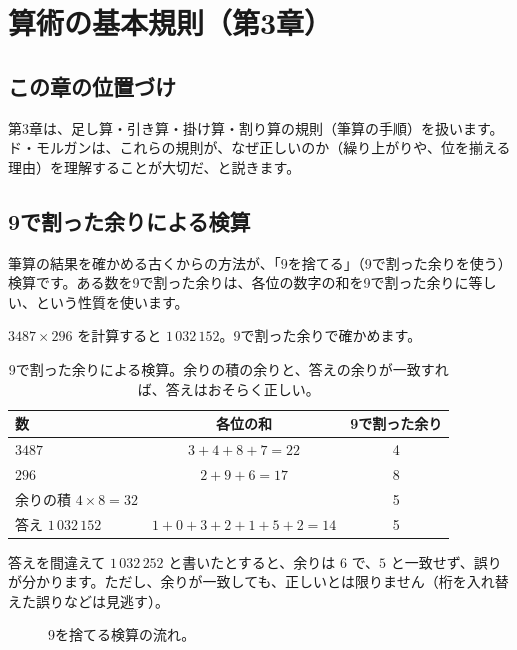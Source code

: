 \documentclass[a4paper,11pt,openany]{ltjsbook}
\begin{document}
\chapter{算術の基本規則（第3章）}

\section{この章の位置づけ}

第3章は、足し算・引き算・掛け算・割り算の規則（筆算の手順）を扱います。ド・モルガンは、これらの規則が、なぜ正しいのか（繰り上がりや、位を揃える理由）を理解することが大切だ、と説きます。

\section{9で割った余りによる検算}

筆算の結果を確かめる古くからの方法が、「9を捨てる」（9で割った余りを使う）検算です。ある数を9で割った余りは、各位の数字の和を9で割った余りに等しい、という性質を使います。

$3487\times296$ を計算すると $1\,032\,152$。9で割った余りで確かめます。

\begin{table}[htbp]
\centering
\begin{tabular}{lcc}
\toprule
数 & 各位の和 & 9で割った余り\\
\midrule
$3487$ & $3+4+8+7=22$ & 4\\
$296$ & $2+9+6=17$ & 8\\
余りの積 $4\times8=32$ & & 5\\
答え $1\,032\,152$ & $1+0+3+2+1+5+2=14$ & 5\\
\bottomrule
\end{tabular}
\caption{9で割った余りによる検算。余りの積の余りと、答えの余りが一致すれば、答えはおそらく正しい。}
\end{table}

答えを間違えて $1\,032\,252$ と書いたとすると、余りは $6$ で、$5$ と一致せず、誤りが分かります。ただし、余りが一致しても、正しいとは限りません（桁を入れ替えた誤りなどは見逃す）。

\begin{figure}[htbp]
\centering
{}
\caption{9を捨てる検算の流れ。}
\end{figure}
\end{document}
